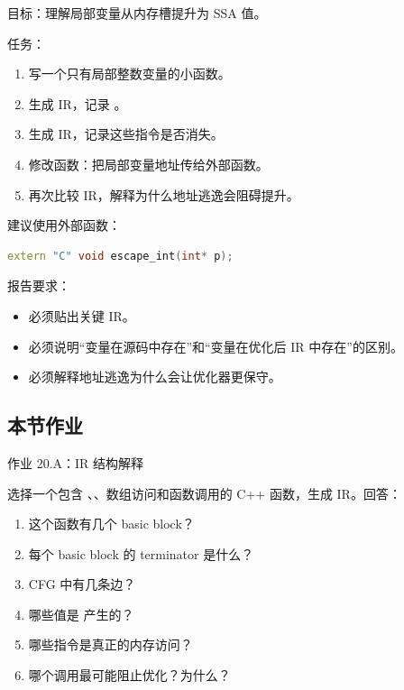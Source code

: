 \begin{labbox}
目标：理解局部变量从内存槽提升为 SSA 值。

任务：

\begin{enumerate}
  \item 写一个只有局部整数变量的小函数。
  \item 生成  IR，记录 。
  \item 生成  IR，记录这些指令是否消失。
  \item 修改函数：把局部变量地址传给外部函数。
  \item 再次比较 IR，解释为什么地址逃逸会阻碍提升。
\end{enumerate}

建议使用外部函数：

\begin{lstlisting}[language=C++]
extern "C" void escape_int(int* p);
\end{lstlisting}

报告要求：

\begin{itemize}
  \item 必须贴出关键 IR。
  \item 必须说明“变量在源码中存在”和“变量在优化后 IR 中存在”的区别。
  \item 必须解释地址逃逸为什么会让优化器更保守。
\end{itemize}
\end{labbox}

\subsection{本节作业}

\begin{exercisebox}
作业 20.A：IR 结构解释

选择一个包含 、、数组访问和函数调用的 C++ 函数，生成  IR。回答：

\begin{enumerate}
  \item 这个函数有几个 basic block？
  \item 每个 basic block 的 terminator 是什么？
  \item CFG 中有几条边？
  \item 哪些值是  产生的？
  \item 哪些指令是真正的内存访问？
  \item 哪个调用最可能阻止优化？为什么？
\end{enumerate}
\end{exercisebox}

